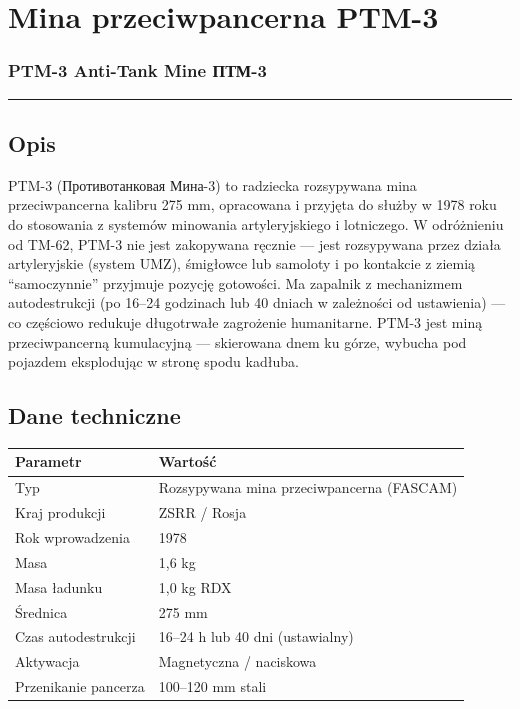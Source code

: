 \documentclass[12pt,openany,oneside]{book}
\begin{document}
\chapter{Mina przeciwpancerna PTM-3}\label{mina-przeciwpancerna-ptm-3}

\subsection{PTM-3 Anti-Tank Mine \textbar{}
ПТМ-3}\label{ptm-3-anti-tank-mine-ux43fux442ux43c-3}

\begin{center}\rule{0.5\linewidth}{0.5pt}\end{center}

\section{Opis}\label{opis-116}

PTM-3 (Противотанковая Мина-3) to radziecka rozsypywana mina
przeciwpancerna kalibru 275 mm, opracowana i przyjęta do służby w 1978
roku do stosowania z systemów minowania artyleryjskiego i lotniczego. W
odróżnieniu od TM-62, PTM-3 nie jest zakopywana ręcznie --- jest
rozsypywana przez działa artyleryjskie (system UMZ), śmigłowce lub
samoloty i po kontakcie z ziemią ``samoczynnie'' przyjmuje pozycję
gotowości. Ma zapalnik z mechanizmem autodestrukcji (po 16--24 godzinach
lub 40 dniach w zależności od ustawienia) --- co częściowo redukuje
długotrwałe zagrożenie humanitarne. PTM-3 jest miną przeciwpancerną
kumulacyjną --- skierowana dnem ku górze, wybucha pod pojazdem
eksplodując w stronę spodu kadłuba.

\section{Dane techniczne}\label{dane-techniczne-116}

\begin{longtable}[]{@{}ll@{}}
\toprule\noalign{}
Parametr & Wartość \\
\midrule\noalign{}
\endhead
\bottomrule\noalign{}
\endlastfoot
Typ & Rozsypywana mina przeciwpancerna (FASCAM) \\
Kraj produkcji & ZSRR / Rosja \\
Rok wprowadzenia & 1978 \\
Masa & 1,6 kg \\
Masa ładunku & 1,0 kg RDX \\
Średnica & 275 mm \\
Czas autodestrukcji & 16--24 h lub 40 dni (ustawialny) \\
Aktywacja & Magnetyczna / naciskowa \\
Przenikanie pancerza & 100--120 mm stali \\
\end{longtable}
\end{document}
